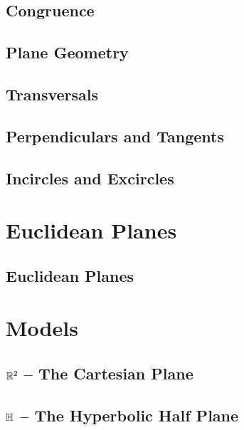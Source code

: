 \documentclass{memoir}
\begin{document}
  \section{Congruence}
    
    \newpage

  \section{Plane Geometry}
    
    \newpage

  \section{Transversals}
    
    \newpage

  \section{Perpendiculars and Tangents}
    
    \newpage

  \section{Incircles and Excircles}
    


\chapter{Euclidean Planes}
\newpage

  \section{Euclidean Planes}
    


\chapter{Models}
\newpage

  \section{\(\mathbb{R}^2\) -- The Cartesian Plane}
    
    \newpage

  \section{\(\mathbb{H}\) -- The Hyperbolic Half Plane}
    
    \newpage
\end{document}
